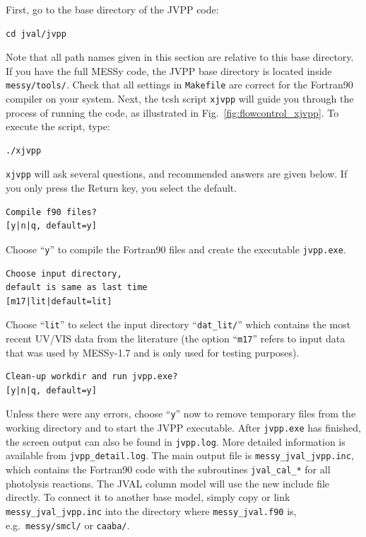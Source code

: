 \documentclass[a4paper,twoside]{article}
\begin{document}
First, go to the base directory of the JVPP code:
\begin{verbatim}
cd jval/jvpp
\end{verbatim}
Note that all path names given in this section are relative to this base
directory. If you have the full MESSy code, the JVPP base directory is
located inside {\tt messy/tools/}. Check that all settings in
\verb|Makefile| are correct for the Fortran90 compiler on your system.
Next, the tcsh script \verb|xjvpp| will guide you through the process of
running the code, as illustrated in Fig.~\ref{fig:flowcontrol_xjvpp}. To
execute the script, type:
\begin{verbatim}
./xjvpp
\end{verbatim}
\verb|xjvpp| will ask several questions, and recommended answers are
given below. If you only press the Return key, you select the default.
\begin{verbatim}
Compile f90 files?
[y|n|q, default=y]
\end{verbatim}
Choose ``\verb|y|'' to compile the Fortran90 files and create the
executable \verb|jvpp.exe|.
\begin{verbatim}
Choose input directory,
default is same as last time
[m17|lit|default=lit]
\end{verbatim}
Choose ``\verb|lit|'' to select the input directory ``\verb|dat_lit/|''
which contains the most recent UV/VIS data from the literature (the
option ``\verb|m17|'' refers to input data that was used by MESSy-1.7
and is only used for testing purposes).
\begin{verbatim}
Clean-up workdir and run jvpp.exe?
[y|n|q, default=y]
\end{verbatim}
Unless there were any errors, choose ``\verb|y|'' now to remove
temporary files from the working directory and to start the JVPP
executable. After \verb|jvpp.exe| has finished, the screen output can
also be found in \verb|jvpp.log|. More detailed information is available
from \verb|jvpp_detail.log|. The main output file is
\verb|messy_jval_jvpp.inc|, which contains the Fortran90 code with the
subroutines \verb|jval_cal_*| for all photolysis reactions. The JVAL
column model will use the new include file directly. To connect it to
another base model, simply copy or link \verb|messy_jval_jvpp.inc| into
the directory where \verb|messy_jval.f90| is, e.g.\ \verb|messy/smcl/|
or \verb|caaba/|.
\end{document}
